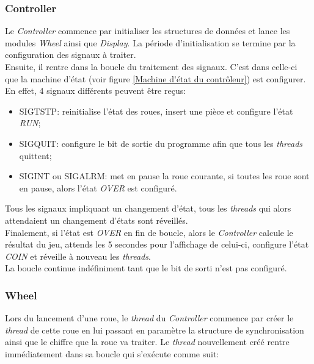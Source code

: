 \documentclass[11pt, a4paper]{article}
\begin{document}
\subsubsection{Controller}
Le \textit{Controller} commence par initialiser les structures de données
et lance les modules \textit{Wheel} ainsi que \textit{Display}.
La période d'initialisation se termine par la configuration des signaux à traiter. \\

Ensuite, il rentre dans la boucle du traitement des signaux.
C'est dans celle-ci que la machine d'état (voir figure \ref{Machine d'état du contrôleur}) est configurer.
En effet, 4 signaux différents peuvent être reçus:
\begin{itemize}
    \item SIGTSTP: reinitialise l'état des roues, insert une pièce et configure l'état \textit{RUN};
    \item SIGQUIT: configure le bit de sortie du programme afin que tous les \textit{threads} quittent;
    \item SIGINT ou SIGALRM: met en pause la roue courante,
          si toutes les roue sont en pause, alors l'état \textit{OVER} est configuré. \\
\end{itemize}

Tous les signaux impliquant un changement d'état, tous les \textit{threads}
qui alors attendaient un changement d'états sont réveillés. \\

Finalement, si l'état est \textit{OVER} en fin de boucle, alors le \textit{Controller} calcule le résultat du jeu,
attends les 5 secondes pour l'affichage de celui-ci, configure l'état \textit{COIN} et réveille à nouveau les \textit{threads}. \\

La boucle continue indéfiniment tant que le bit de sorti n'est pas configuré.

\subsubsection{Wheel}
Lors du lancement d'une roue, le \textit{thread} du \textit{Controller} commence par créer le \textit{thread} de cette roue
en lui passant en paramètre la structure de synchronisation ainsi que le chiffre que la roue va traiter.
Le \textit{thread} nouvellement créé rentre immédiatement dans sa boucle qui s'exécute comme suit: \\
\end{document}
